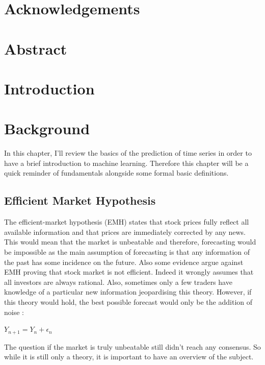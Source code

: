 \documentclass[11pt,a4paper,oneside]{book}
\begin{document}
\chapter*{Acknowledgements}


\tableofcontents


\chapter*{Abstract}


\chapter{Introduction}


\chapter{Background}

In this chapter, I'll review the basics of the prediction of time series in order to have a brief introduction to machine learning. Therefore this chapter will be a quick reminder of fundamentals alongside some formal basic definitions. 



\section{Efficient Market Hypothesis}

The efficient-market hypothesis (EMH) states that stock prices fully reflect all available information and that prices are immediately corrected by any news. This would mean that the market is unbeatable and therefore, forecasting would be impossible as the main assumption of forecasting is that any information of the past has some incidence on the future. Also some evidence argue against EMH proving that stock market is not efficient. Indeed it wrongly assumes that all investors are always rational. Also, sometimes only a few traders have knowledge of a particular new information jeopardising this theory. However, if this theory would hold, the best possible forecast would only be the addition of noise \cite{aamodt} : 

\begin{center}
    $Y_{n+1} = Y_{n} + \epsilon_{n}$
\end{center}


The question if the market is truly unbeatable still didn't reach any consensus. So while it is still only a theory, it is important to have an overview of the subject. 
\end{document}
